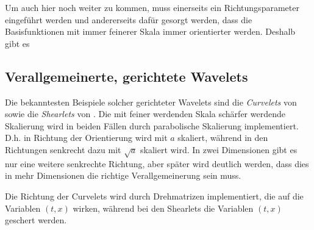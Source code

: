 Um auch hier noch weiter zu kommen, muss einerseits ein Richtungsparameter eingeführt werden und andererseits dafür gesorgt werden, dass die Basisfunktionen mit immer feinerer Skala immer orientierter werden. Deshalb gibt es


\subsection{Verallgemeinerte, gerichtete Wavelets} %
\label{sec:verallgemeinerte_gerichtete_wavelets}


 Die bekanntesten Beispiele solcher gerichteter Wavelets sind die \textit{Curvelets} von \textcite{Candes2005} sowie die \textit{Shearlets} von \textcite{Kutyniok2008}. Die mit feiner werdenden Skala schärfer werdende Skalierung wird in beiden Fällen durch parabolische Skalierung implementiert. D.h. in Richtung der Orientierung wird mit $a$ skaliert, während in den Richtungen senkrecht dazu mit $\sqrt a$ skaliert wird. In zwei Dimensionen gibt es nur eine weitere senkrechte Richtung, aber später wird deutlich werden, dass dies in mehr Dimensionen die richtige Verallgemeinerung sein muss.

 Die Richtung der Curvelets wird durch Drehmatrizen implementiert, die auf die Variablen $(t,x)$ wirken, während bei den Shearlets die Variablen $(t,x)$ geschert werden.




